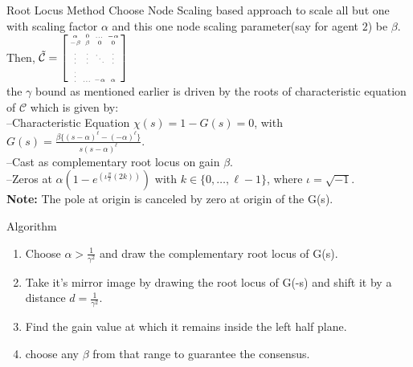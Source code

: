 \begin{subframe}{Root Locus Method}\label{RLSimbase}
	\vspace*{-0.2cm}
	Choose Node Scaling based approach to scale all but one with scaling factor $\alpha$ and this one node scaling parameter(say for agent $2$) be $\beta$. Then,
	$\Tilde{\mathcal{C}}=\tiny{\begin{bsmallmatrix}
		\alpha  & 0 & \dots & -\alpha \\
		-\beta & \beta & 0 & 0 \\
		\vdots & \vdots & \ddots & \vdots \\
		\vdots & \dots & -\alpha & \alpha
	\end{bsmallmatrix}}$\\
	the $\gamma$ bound as mentioned earlier is driven by the roots of characteristic equation of $\mathcal{C}$ which is given by:\\
	--Characteristic Equation $\chi(s)=1-G(s)=0$, with $G(s)=\frac{\beta\{(s-\alpha)^\ell-(-\alpha)^\ell\}}{s(s-\alpha)^\ell}$.\\
	--Cast as complementary root locus on gain $\beta$.\\
	--Zeros at $\alpha(1-e^{(\iota \frac{\pi}{\ell}(2k))})$ with $k\in\{0,\ldots,\ell-1\}$, where $\iota=\sqrt{-1}$.\\
	\textbf{Note: } The pole at origin is canceled by zero at origin of the G(s).
	\vspace*{-0.2cm}
	\begin{block}{Algorithm}\label{Algo}
		\begin{enumerate}
			\item Choose $\alpha>\frac{1}{\gamma^2}$ and draw the complementary root locus of G(s).
			\item Take it's mirror image by drawing the root locus of G(-s) and shift it by a distance $d=\frac{1}{\gamma^2}$.
			\item Find the gain value at which it remains inside the left half plane.%
			\item choose any $\beta$ from that range to guarantee the consensus.
		\end{enumerate}
	\end{block}  
\end{subframe}

